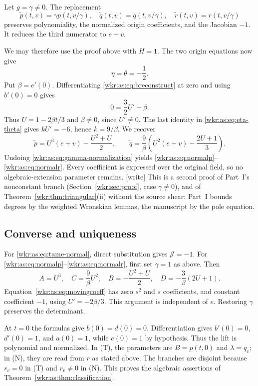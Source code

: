 \documentclass[11pt,a4paper]{article}
\numberwithin{equation}{section}
\theoremstyle{definition}
\theoremstyle{remark}
\newcommand{\J}{\mathcal{J}}
\begin{document}
Let $g=\gamma\ne0$. The replacement
\begin{equation}\label{wkr:as:eq:gamma-normalization}
\widetilde p(t,v)=\gamma p(t,v/\gamma),\quad
\widetilde q(t,v)=q(t,v/\gamma),\quad
\widetilde r(t,v)=r(t,v/\gamma)
\end{equation}
preserves polynomiality, the normalized origin coefficients, and the
Jacobian $-1$. It reduces the third numerator to $e+v$.

We may therefore use the proof above with $H=1$. The two origin equations
now give
\[
\eta=\theta=-\frac12.
\]
Put $\beta=e'(0)$. Differentiating \eqref{wkr:as:eq:breconstruct} at
zero and using $b'(0)=0$ gives
\[
0=\frac32U'+\beta.
\]
Thus $U=1-2\beta t/3$ and $\beta\ne0$, since $U'\ne0$. The last identity
in \eqref{wkr:as:eq:eta-theta} gives $kU'=-6$, hence $k=9/\beta$. We
recover
\[
\widetilde p=U^3(e+v)-\frac{U^2+U}{2},\qquad
\widetilde q=\frac9\beta\left(U^2(e+v)-\frac{2U+1}{3}\right).
\]
Undoing \eqref{wkr:as:eq:gamma-normalization} yields
\eqref{wkr:as:eq:normalp}--\eqref{wkr:as:eq:normalr}. Every coefficient is
expressed over the original field, so no algebraic-extension parameter
remains.
\textup{[write]} This is a second proof of Part~I's nonconstant branch
(Section~\ref{wkr:sec:proof}, case $\gamma\ne0$), and of
Theorem~\ref{wkr:thm:triangular}(ii) without the source shear: Part~I
bounds degrees by the weighted Wronskian lemmas, the manuscript by the
pole equation.

\subsection{Converse and uniqueness}

For \eqref{wkr:as:eq:tame-normal}, direct substitution gives $\J=-1$.
For \eqref{wkr:as:eq:normalp}--\eqref{wkr:as:eq:normalr}, first set
$\gamma=1$ as above. Then
\[
A=U^3,\quad C=\frac9\beta U^2,\quad
B=-\frac{U^2+U}{2},\quad D=-\frac3\beta(2U+1).
\]
Equation~\eqref{wkr:as:eq:movingcoeff} has zero $s^2$ and $s$
coefficients, and constant coefficient $-1$, using $U'=-2\beta/3$. This
argument is independent of $e$. Restoring $\gamma$ preserves the
determinant.

At $t=0$ the formulas give $b(0)=d(0)=0$. Differentiation gives
$b'(0)=0$, $d'(0)=1$, and $a(0)=1$, while $e(0)=1$ by hypothesis.
Thus the lift is polynomial and normalized. In (T), the parameters are
$B=p(t,0)$ and $\lambda=q_v$; in (N), they are read from $r$ as stated
above. The branches are disjoint because $r_v=0$ in (T) and $r_v\ne0$
in (N). This proves the algebraic assertions of
Theorem~\ref{wkr:as:thm:classification}.
\end{document}
